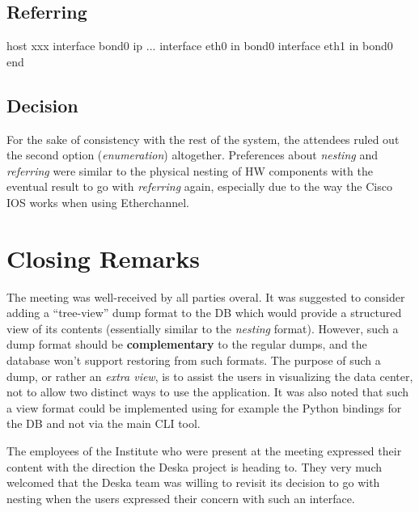 \documentclass[12pt]{article}
\begin{document}
\subsection{Referring}
\begin{listing}{1}
host xxx
    interface bond0 ip ...
    interface eth0 in bond0
    interface eth1 in bond0
end
\end{listing}

\subsection{Decision}

For the sake of consistency with the rest of the system, the attendees ruled out
the second option ({\em enumeration}) altogether.  Preferences about {\em
nesting} and {\em referring} were similar to the physical nesting of HW
components with the eventual result to go with {\em referring} again, especially
due to the way the Cisco IOS works when using Etherchannel.

\section{Closing Remarks}

The meeting was well-received by all parties overal.  It was suggested to
consider adding a ``tree-view'' dump format to the DB which would provide a
structured view of its contents (essentially similar to the {\em nesting}
format).  However, such a dump format should be {\bf complementary} to the
regular dumps, and the database won't support restoring from such formats.  The
purpose of such a dump, or rather an {\em extra view}, is to assist the users in
visualizing the data center, not to allow two distinct ways to use the
application.  It was also noted that such a view format could be implemented
using for example the Python bindings for the DB and not via the main CLI tool.

The employees of the Institute who were present at the meeting expressed their
content with the direction the Deska project is heading to.  They very much
welcomed that the Deska team was willing to revisit its decision to go with
nesting when the users expressed their concern with such an interface.
\end{document}
